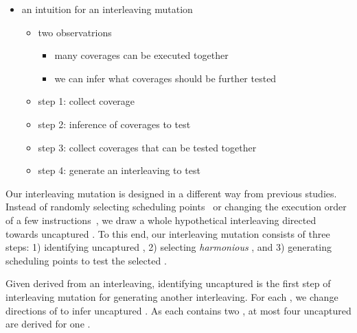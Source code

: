 


\begin{itemize}
\item an intuition for an interleaving mutation
  \begin{itemize}
  \item two observatrions
    \begin{itemize}
      \item many coverages can be executed together
      \item we can infer what coverages should be further tested
      \end{itemize}
  \item step 1: collect coverage
  \item step 2: inference of coverages to test
  \item step 3: collect coverages that can be tested together
  \item step 4: generate an interleaving to test
  \end{itemize}
\end{itemize}




Our interleaving mutation is designed in a different way from previous
studies.
%
Instead of randomly selecting scheduling points~\cite{krace, ski} or
changing the execution order of a few instructions~\cite{razzer,
  snowboard}, we draw a whole hypothetical interleaving directed
towards uncaptured \segments.
%
To this end, our interleaving mutation consists of three steps:
%
1) identifying uncaptured \segments, 2) selecting \textit{harmonious}
\segments, and 3) generating scheduling points to test the selected
\segments.

%
Given \segments derived from an interleaving, identifying uncaptured
\segments is the first step of interleaving mutation for generating
another interleaving.
%
For each \segment, we change directions of \mutables to infer
uncaptured \segments.
%
As each \segment contains two \mutables, at most four uncaptured
\segments are derived for one \segment.

